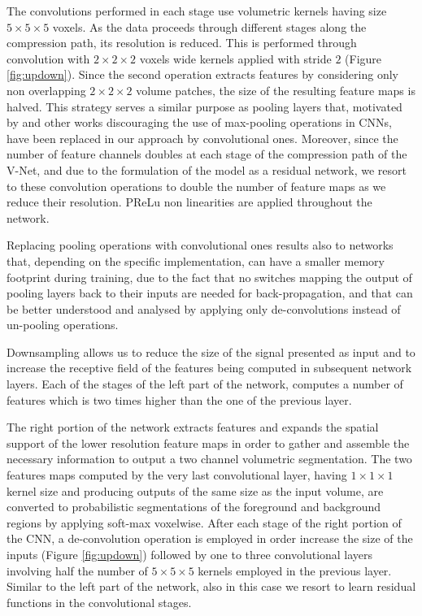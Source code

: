 The convolutions performed in each stage use volumetric kernels having size $5\times5\times5$ voxels.
As the data proceeds through different stages along the compression path, its resolution is reduced. This is performed through convolution with $2\times2\times2$ voxels wide kernels applied with stride $2$ (Figure \ref{fig:updown}). Since the second operation extracts features by considering only non overlapping $2\times2\times2$ volume patches, the size of the resulting feature maps is halved. 
This strategy serves a similar purpose as pooling layers that, motivated by \cite{springenberg2014striving} and other works discouraging the use of max-pooling operations in CNNs, have been replaced in our approach by convolutional ones. Moreover, since the number of feature channels doubles at each stage of the compression path of the V-Net, and due to the formulation of the model as a residual network, we resort to these convolution operations to double the number of feature maps as we reduce their resolution. PReLu non linearities are applied throughout the network.

Replacing pooling operations with convolutional ones results also to networks that, depending on the specific implementation, can have a smaller memory footprint during training, due to the fact that no switches mapping the output of pooling layers back to their inputs are needed for back-propagation, and that can be better understood and analysed \cite{zeiler2014visualizing} by applying only de-convolutions instead of un-pooling operations. 

Downsampling allows us to reduce the size of the signal presented as input and to increase the receptive field of the features being computed in subsequent network layers. Each of the stages of the left part of the network, computes a number of features which is two times higher than the one of the previous layer.

The right portion of the network extracts features and expands the spatial support of the lower resolution feature maps in order to gather and assemble the necessary information to output a two channel volumetric segmentation. The two features maps computed by the very last convolutional layer, having $1\times1\times1$ kernel size and producing outputs of the same size as the input volume, are converted to probabilistic segmentations of the foreground and background regions by applying soft-max voxelwise.
After each stage of the right portion of the CNN, a de-convolution operation is employed in order increase the size of the inputs (Figure \ref{fig:updown}) followed by one to three convolutional layers involving half the number of $5\times5\times5$ kernels employed in the previous layer. Similar to the left part of the network, also in this case we resort to learn residual functions in the convolutional stages.

